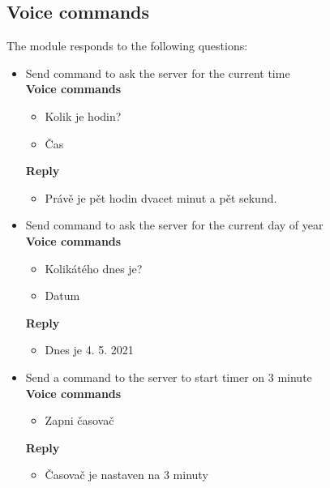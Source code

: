 

\subsection{Voice commands}
The module responds to the following questions:
\begin{itemize}
    \item Send command to ask the server for the current time\\
    \textbf{Voice commands}
    \begin{itemize}
        \item Kolik je hodin?
        \item Čas
    \end{itemize}
    \textbf{Reply}
    \begin{itemize}
        \item Právě je pět hodin dvacet minut a pět sekund.
    \end{itemize}
    \item Send command to ask the server for the current day of year\\
    \textbf{Voice commands}
    \begin{itemize}
        \item Kolikátého dnes je?
        \item Datum
    \end{itemize}
    \textbf{Reply}
    \begin{itemize}
        \item Dnes je 4. 5. 2021
    \end{itemize}
    \item Send a command to the server to start timer on 3 minute\\
    \textbf{Voice commands}
    \begin{itemize}
        \item Zapni časovač
    \end{itemize}
    \textbf{Reply}
    \begin{itemize}
        \item Časovač je nastaven na 3 minuty

\end{itemize}
\end{itemize}
